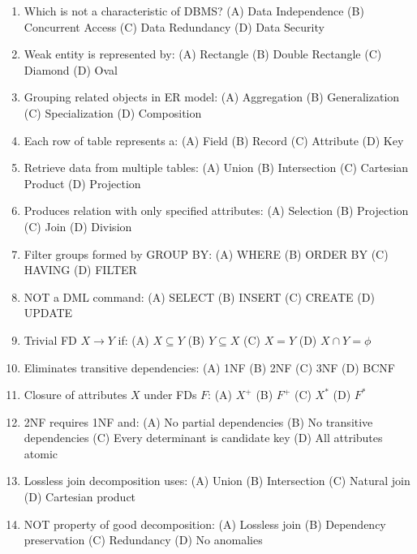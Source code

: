 \documentclass[11pt,a4paper]{article}
\begin{document}
\begin{enumerate}
\item Which is not a characteristic of DBMS? (A) Data Independence (B) Concurrent Access (C) Data Redundancy (D) Data Security

\item Weak entity is represented by: (A) Rectangle (B) Double Rectangle (C) Diamond (D) Oval

\item Grouping related objects in ER model: (A) Aggregation (B) Generalization (C) Specialization (D) Composition

\item Each row of table represents a: (A) Field (B) Record (C) Attribute (D) Key

\item Retrieve data from multiple tables: (A) Union (B) Intersection (C) Cartesian Product (D) Projection

\item Produces relation with only specified attributes: (A) Selection (B) Projection (C) Join (D) Division

\item Filter groups formed by GROUP BY: (A) WHERE (B) ORDER BY (C) HAVING (D) FILTER

\item NOT a DML command: (A) SELECT (B) INSERT (C) CREATE (D) UPDATE

\item Trivial FD $X \to Y$ if: (A) $X \subseteq Y$ (B) $Y \subseteq X$ (C) $X = Y$ (D) $X \cap Y = \phi$

\item Eliminates transitive dependencies: (A) 1NF (B) 2NF (C) 3NF (D) BCNF

\item Closure of attributes $X$ under FDs $F$: (A) $X^+$ (B) $F^+$ (C) $X^*$ (D) $F^*$

\item 2NF requires 1NF and: (A) No partial dependencies (B) No transitive dependencies (C) Every determinant is candidate key (D) All attributes atomic

\item Lossless join decomposition uses: (A) Union (B) Intersection (C) Natural join (D) Cartesian product

\item NOT property of good decomposition: (A) Lossless join (B) Dependency preservation (C) Redundancy (D) No anomalies


\end{enumerate}
\end{document}
